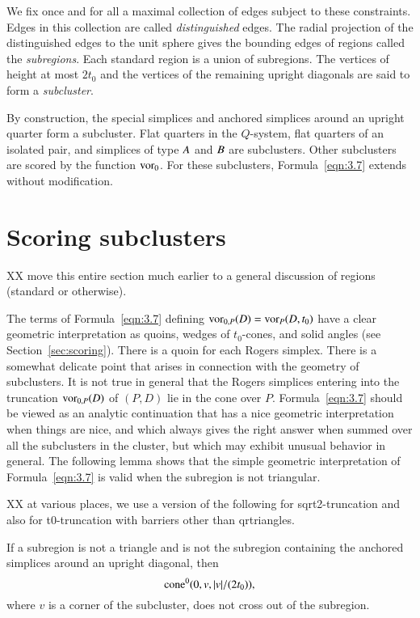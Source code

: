 We fix once and for all a maximal collection of edges subject to
these constraints. Edges in this collection are called {\it
distinguished\/} edges. The radial projection of the distinguished
edges to the unit sphere gives the bounding edges of regions
called the {\it subregions}.  Each standard region is a union of
subregions. The vertices of height at most $2t_0$ and the vertices
of the remaining upright diagonals are said to form a {\it
subcluster}.


By construction, the special simplices and anchored simplices
around an upright quarter form a subcluster.  Flat quarters in the
$Q$-system, flat quarters of an isolated pair, and simplices of
type $A$ and $B$ are subclusters.  Other subclusters are
scored by the function $\operatorname{vor}_0$. For these subclusters,
Formula~\ref{eqn:3.7} extends without modification.

\section{Scoring subclusters} %

XX move this entire section much earlier to a general discussion
of regions (standard or otherwise).

The terms of Formula~\ref{eqn:3.7} defining
$\operatorname{vor}_{0,P}(D)=\operatorname{vor}_P(D,t_0)$ have a clear geometric
interpretation as quoins, wedges of $t_0$-cones, and solid angles
(see Section~\ref{sec:scoring}). There is a quoin for each Rogers
simplex. There is a somewhat delicate point that arises in
connection with the geometry of subclusters.  It is not true in
general that the Rogers simplices entering into the truncation
$\operatorname{vor}_{0,P}(D)$ of $(P,D)$ lie in the cone over $P$.
Formula~\ref{eqn:3.7} should be viewed as an analytic continuation
that has a nice geometric interpretation when things are nice, and
which always gives the right answer when summed over all the
subclusters in the cluster, but which may exhibit unusual behavior
in general. The following lemma shows that the simple geometric
interpretation of Formula~\ref{eqn:3.7} is valid when the
subregion is not triangular.

XX at various places, we use a version of the following 
for sqrt2-truncation
and also for t0-truncation with barriers other than qrtriangles.


\begin{lemma}
    \label{lemma:no-cross}
If a subregion is not a triangle and is not  the subregion
containing the anchored simplices around an upright diagonal, then
   $${\operatorname{cone}}^0(0,v,|v|/(2t_0)),$$
where $v$ is a corner of the subcluster,
does not cross out of the subregion.
\end{lemma}

